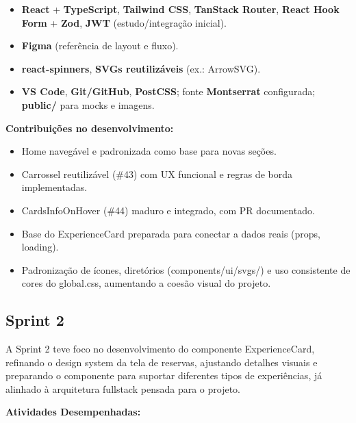 \begin{itemize}
\item
  \textbf{React} + \textbf{TypeScript}, \textbf{Tailwind CSS},
  \textbf{TanStack Router}, \textbf{React Hook Form} + \textbf{Zod},
  \textbf{JWT} (estudo/integração inicial).
\item
  \textbf{Figma} (referência de layout e fluxo).
\item
  \textbf{react-spinners}, \textbf{SVGs reutilizáveis} (ex.: ArrowSVG).
\item
  \textbf{VS Code}, \textbf{Git/GitHub}, \textbf{PostCSS}; fonte
  \textbf{Montserrat} configurada; \textbf{public/} para mocks e
  imagens.
\end{itemize}

\textbf{Contribuições no desenvolvimento:}

\begin{itemize}
\item
  Home navegável e padronizada como base para novas seções.
\item
  Carrossel reutilizável (\#43) com UX funcional e regras de borda
  implementadas.
\item
  CardsInfoOnHover (\#44) maduro e integrado, com PR documentado.
\item
  Base do ExperienceCard preparada para conectar a dados reais (props,
  loading).
\item
  Padronização de ícones, diretórios (components/ui/svgs/) e uso
  consistente de cores do global.css, aumentando a coesão visual do
  projeto.
\end{itemize}

\subsection{Sprint 2}

A Sprint 2 teve foco no desenvolvimento do componente ExperienceCard,
refinando o design system da tela de reservas, ajustando detalhes
visuais e preparando o componente para suportar diferentes tipos de
experiências, já alinhado à arquitetura fullstack pensada para o
projeto.

\textbf{Atividades Desempenhadas:}

